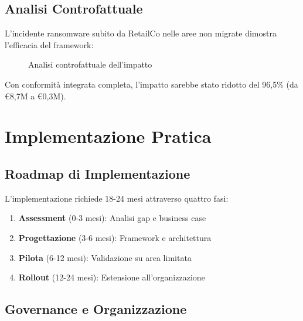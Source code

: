 \subsection{Analisi Controfattuale}
\label{subsec:4.4.2_controfattuale}

L'incidente ransomware subito da RetailCo nelle aree non migrate dimostra l'efficacia del framework:

\begin{figure}[h]
    \centering
    \caption{Analisi controfattuale dell'impatto}
    \label{fig:confronto}
\end{figure}

Con conformità integrata completa, l'impatto sarebbe stato ridotto del 96,5\% (da €8,7M a €0,3M).

\section{Implementazione Pratica}
\label{sec:4.5_implementazione}

\subsection{Roadmap di Implementazione}
\label{subsec:4.5.1_roadmap}

L'implementazione richiede 18-24 mesi attraverso quattro fasi:

\begin{enumerate}
    \item \textbf{Assessment} (0-3 mesi): Analisi gap e business case
    \item \textbf{Progettazione} (3-6 mesi): Framework e architettura
    \item \textbf{Pilota} (6-12 mesi): Validazione su area limitata
    \item \textbf{Rollout} (12-24 mesi): Estensione all'organizzazione
\end{enumerate}

\subsection{Governance e Organizzazione}
\label{subsec:4.5.2_governance}

